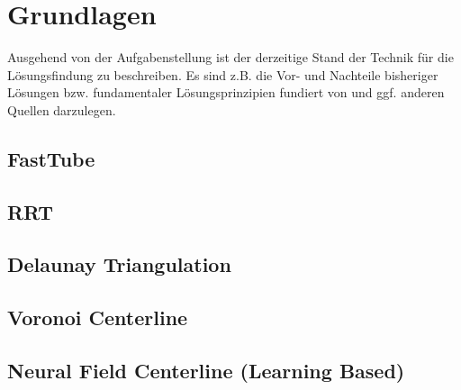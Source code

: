 

\chapter{Grundlagen}
Ausgehend von der Aufgabenstellung ist der derzeitige Stand der Technik für die Lösungsfindung zu beschreiben. Es sind z.B. die Vor- und Nachteile bisheriger Lösungen bzw. fundamentaler Lösungsprinzipien fundiert von und ggf. anderen Quellen darzulegen.

\section{FastTube}

\section{RRT}

\section{Delaunay Triangulation}

\section{Voronoi Centerline}

\section{Neural Field Centerline (Learning Based)}
